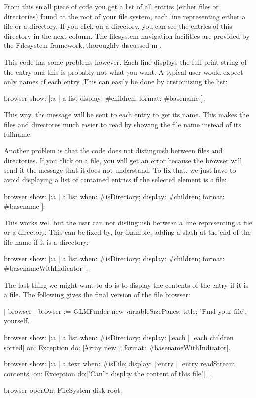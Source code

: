 \documentclass[a4paper,10pt,twoside]{book}
\begin{document}
From this small piece of code you get a list of all entries (either
files or directories) found at the root of your file system, each line
representing either a file or a directory. If you click on a
directory, you can see the entries of this directory in the next
column. The filesystem navigation facilities are provided by the
Filesystem framework, thoroughly discussed in .

This code has some problems however. Each line displays the full print
string of the entry and this is probably not what you want. A typical
user would expect only names of each entry. This can easily be done by
customizing the list:

\begin{code}{}
browser	show: [:a | 
   a list
  	  display: #children;
  	  format: #basename ].
\end{code}

This way, the message  will be sent to each entry to get its
name. This makes the files and directores much easier to read by showing the file name instead of its fullname.

Another problem is that the code does not distinguish between files
and directories. If you click on a file, you will get an error because
the browser will send it the message  that it does not
understand. To fix that, we just have to avoid displaying a list of
contained entries if the selected element is a file:

\begin{code}{}
browser show: [:a | 
   a list
  	  when: #isDirectory;
  	  display: #children;
  	  format: #basename ].
\end{code}

This works well but the user can not distinguish between a line
representing a file or a directory. This can be fixed by, for example,
adding a slash at the end of the file name if it is a directory:

\begin{code}{}
browser show: [:a | 
  a list
  	 when: #isDirectory;
  	 display: #children;
  	 format: #basenameWithIndicator ].
\end{code}

The last thing we might want to do is to display the contents of the
entry if it is a file. The following gives the final version of the
file browser:

\begin{code}{}
| browser |
browser := GLMFinder new
  variableSizePanes;
  title: 'Find your file';
  yourself.

browser show: [:a | 
	a list
  		when: #isDirectory;
  		display: [:each | [each children sorted]
                       		on: Exception
                       		do: [Array new]];
  		format: #basenameWithIndicator].

browser show: [:a | 
    a text
  		when: #isFile;
  		display: [:entry | [entry readStream contents]
                            on: Exception
                        	do:['Can''t display the content of this file']]].
	
browser openOn: FileSystem disk root.
\end{code}     
                        
\end{document}
